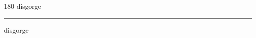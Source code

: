 
\begin{frame}
\begin{center}
\begin{turn}{180}
{\fontsize{2.5cm}{1em}\selectfont disgorge}
\end{turn}
\vspace{1em}\par  
\hrule
\vspace{1em}\par  
{\fontsize{2.5cm}{1em}\selectfont disgorge}
\end{center}
\end{frame}
